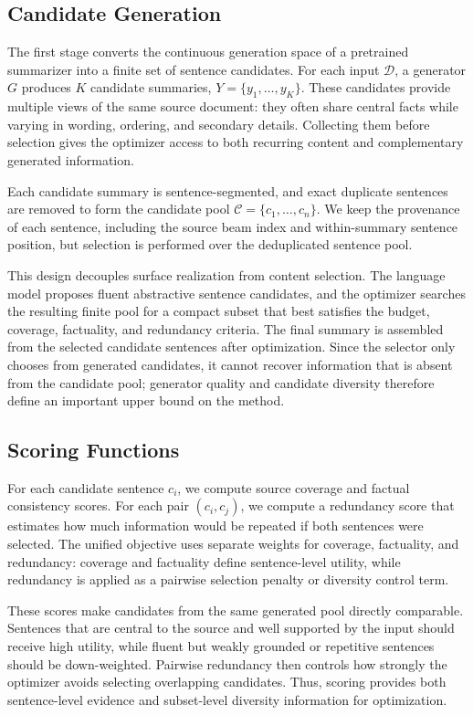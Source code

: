 \documentclass[11pt]{article}
\begin{document}
\subsection{Candidate Generation}

The first stage converts the continuous generation space of a pretrained summarizer into a finite set of sentence candidates. For each input $\mathcal{D}$, a generator $G$ produces $K$ candidate summaries,
$Y=\{y_1,\ldots,y_K\}$. These candidates provide multiple views of the same source document: they often share central facts while varying in wording, ordering, and secondary details. Collecting them before selection gives the optimizer access to both recurring content and complementary generated information.

Each candidate summary is sentence-segmented, and exact duplicate sentences are removed to form the candidate pool
$\mathcal{C}=\{c_1,\ldots,c_n\}$. We keep the provenance of each sentence, including the source beam index and within-summary sentence position, but selection is performed over the deduplicated sentence pool.

This design decouples surface realization from content selection. The language model proposes fluent abstractive sentence candidates, and the optimizer searches the resulting finite pool for a compact subset that best satisfies the budget, coverage, factuality, and redundancy criteria. The final summary is assembled from the selected candidate sentences after optimization. Since the selector only chooses from generated candidates, it cannot recover information that is absent from the candidate pool; generator quality and candidate diversity therefore define an important upper bound on the method.

\subsection{Scoring Functions}

For each candidate sentence $c_i$, we compute source coverage and factual consistency scores. For each pair $(c_i,c_j)$, we compute a redundancy score that estimates how much information would be repeated if both sentences were selected. The unified objective uses separate weights for coverage, factuality, and redundancy: coverage and factuality define sentence-level utility, while redundancy is applied as a pairwise selection penalty or diversity control term.

These scores make candidates from the same generated pool directly comparable. Sentences that are central to the source and well supported by the input should receive high utility, while fluent but weakly grounded or repetitive sentences should be down-weighted. Pairwise redundancy then controls how strongly the optimizer avoids selecting overlapping candidates. Thus, scoring provides both sentence-level evidence and subset-level diversity information for optimization.
\end{document}
